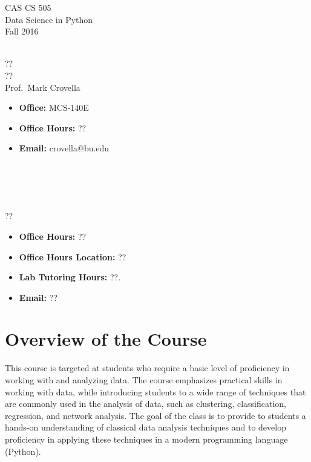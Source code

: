 \documentclass[11pt]{article}
\begin{document}
\sloppy 
\begin{center}
\LARGE CAS CS 505\\
\Large Data Science in Python\\
\Large\rm Fall 2016\\~\\
\end{center}

 ??\\[\baselineskip]
 ??
\\[\baselineskip] 

 Prof.\ Mark Crovella\\[0.75\baselineskip]
\begin{minipage}[t]{0.60\textwidth}
\begin{itemize}
\item {\bf Office:} MCS-140E
\item {\bf Office Hours:} {\small ??}
\item {\bf Email:} crovella@bu.edu
\end{itemize}
\end{minipage}
~\\~\\~\\~\\
 ??\\[0.75\baselineskip]
 \begin{minipage}[t]{0.60\textwidth}
 \begin{itemize}
 \item {\bf Office Hours:} {\small ??}
 \item {\bf Office Hours Location:} ??
 \item {\bf Lab Tutoring Hours:} {\small ??.}
 \item {\bf Email:} ??
 \end{itemize}
 \end{minipage}

\section*{Overview of the Course}

This course is targeted at students who require a basic level of
proficiency in working with and analyzing data.  The course emphasizes
practical skills in working with data, while introducing students to a
wide range of techniques that are commonly used in the analysis of data,
such as clustering, classification, regression, and network analysis.
The goal of the class is to provide to students a hands-on understanding
of classical data analysis techniques and to develop proficiency in
applying these techniques in a modern programming language (Python). 
\end{document}
